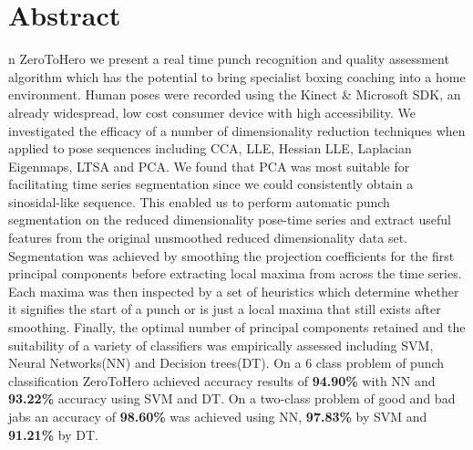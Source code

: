 %
%
%

\chapter*{Abstract}
\begin{SingleSpace}
n ZeroToHero we present a real time punch recognition and quality assessment algorithm which has the potential to bring specialist boxing coaching into a home environment. Human poses were recorded using the Kinect \& Microsoft SDK, an already widespread, low cost consumer device with high accessibility. 
We investigated the efficacy of a number of dimensionality reduction techniques when applied to pose sequences including CCA, LLE, Hessian LLE, Laplacian Eigenmaps, LTSA and PCA. We found that PCA was most suitable for facilitating time series segmentation since we could consistently obtain a sinosidal-like sequence. This enabled us to perform automatic punch segmentation on the reduced dimensionality pose-time series and extract useful features from the original unsmoothed reduced dimensionality data set. Segmentation was achieved by smoothing the projection coefficients for the first principal components before extracting local maxima from across the time series. Each maxima was then inspected by a set of heuristics which determine whether it signifies the start of a punch or is just a local maxima that still exists after smoothing.
Finally, the optimal number of principal components retained and the suitability of a variety of classifiers was empirically assessed including SVM, Neural Networks(NN) and Decision trees(DT). 
On a 6 class problem of punch classification ZeroToHero achieved accuracy results of {\bf 94.90\%} with NN and {\bf 93.22\%} accuracy using SVM and DT. On a two-class problem of good and bad jabs an accuracy of {\bf 98.60\%} was achieved using NN, {\bf 97.83\%} by SVM and {\bf 91.21\%} by DT.








\end{SingleSpace}
\clearpage